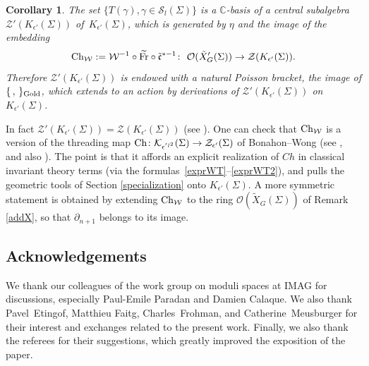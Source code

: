 \documentclass[pdftex]{sigma}%
\numberwithin{equation}{section}
\numberwithin{figure}{section}
\newtheorem{cor}[teo]{Corollary}
\newcommand{\mc}{\mathbb{C}}
\newcommand{\ra}{\rightarrow}
\begin{document}
\begin{cor}%
The set $\{T(\gamma), \gamma\in\mathcal{S}_l(\Sigma)\}$ is a $\mc$-basis of a central subalgebra $\mathcal{Z}'(K_{\epsilon'}(\Sigma))$ of~$K_{\epsilon'}(\Sigma)$, which is generated by $\eta$ and the image of the embedding
\[
{\rm Ch}_{\mathcal{W}} :=\mathcal{W}^{-1}\circ \widetilde{\rm Fr} \circ \tilde{\mathfrak{c}}^{*-1}\colon\ \mathcal{O}(\tilde{X}_G'(\Sigma)) \ra \mathcal{Z}(K_{\epsilon'}(\Sigma)).
\]
Therefore $\mathcal{Z}'(K_{\epsilon'}(\Sigma))$ is endowed with a natural Poisson bracket, the image of $\{\, ,\, \}_{\rm Gold}$, which extends to an action by derivations of $\mathcal{Z}'(K_{\epsilon'}(\Sigma))$ on $K_{\epsilon'}(\Sigma)$.
\end{cor}

In fact $\mathcal{Z}'(K_{\epsilon'}(\Sigma)) = \mathcal{Z}(K_{\epsilon'}(\Sigma))$ (see \cite{FKL}). One can check that ${\rm Ch}_{\mathcal{W}}$ is a version of the threading map ${\rm Ch}\colon \mathcal{K}_{\epsilon^{'l^2}}(\Sigma) \ra \mathcal{Z}_{\epsilon'}(\Sigma)$ of Bonahon--Wong (see \cite{BW1}, and also \cite{FKL2}). The point is that it affords an explicit realization of $Ch$ in classical invariant theory terms (via the for\-mu\-las~\eqref{exprWT}--\eqref{exprWT2}), and pulls the geometric tools of Section \ref{specialization} onto $K_{\epsilon'}(\Sigma)$. A more symmetric statement is obtained by extending ${\rm Ch}_{\mathcal{W}}$ to the ring $\mathcal{O}(\tilde{X}_G(\Sigma))$ of Remark \ref{addX}, so that $\partial_{n+1}$ belongs to its image.

\subsection*{Acknowledgements} We thank our colleagues of the work group on moduli spaces at IMAG for discussions, especially Paul-Emile Paradan and Damien Calaque. We also thank Pavel~Etingof, Matthieu Faitg, Charles~Frohman, and Catherine~Meusburger for their interest and exchanges related to the present work.
Finally, we also thank the referees for their suggestions, which greatly improved the exposition of the paper.
\end{document}
